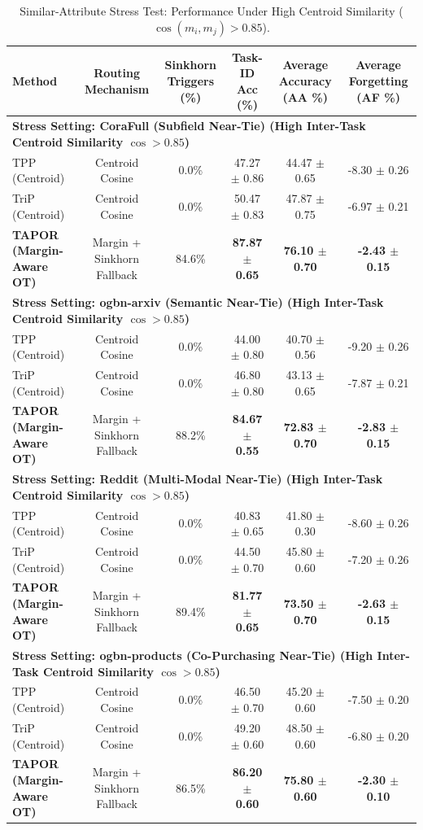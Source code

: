 \begin{table}[t]
\centering
\caption{Similar-Attribute Stress Test: Performance Under High Centroid Similarity ($\cos(m_i, m_j) > 0.85$).}
\begin{tabular}{lccccc}
\hline
\textbf{Method} & \textbf{Routing Mechanism} & \textbf{Sinkhorn Triggers (\%)} & \textbf{Task-ID Acc (\%)} & \textbf{Average Accuracy (AA \%)} & \textbf{Average Forgetting (AF \%)} \\
\hline
\multicolumn{6}{l}{\textbf{Stress Setting: CoraFull (Subfield Near-Tie) (High Inter-Task Centroid Similarity $\cos > 0.85$)}} \\
TPP (Centroid) & Centroid Cosine & 0.0\% & 47.27 $\pm$ 0.86 & 44.47 $\pm$ 0.65 & -8.30 $\pm$ 0.26 \\
TriP (Centroid) & Centroid Cosine & 0.0\% & 50.47 $\pm$ 0.83 & 47.87 $\pm$ 0.75 & -6.97 $\pm$ 0.21 \\
\textbf{TAPOR (Margin-Aware OT)} & Margin + Sinkhorn Fallback & 84.6\% & \textbf{87.87 $\pm$ 0.65} & \textbf{76.10 $\pm$ 0.70} & \textbf{-2.43 $\pm$ 0.15} \\
\hline
\multicolumn{6}{l}{\textbf{Stress Setting: ogbn-arxiv (Semantic Near-Tie) (High Inter-Task Centroid Similarity $\cos > 0.85$)}} \\
TPP (Centroid) & Centroid Cosine & 0.0\% & 44.00 $\pm$ 0.80 & 40.70 $\pm$ 0.56 & -9.20 $\pm$ 0.26 \\
TriP (Centroid) & Centroid Cosine & 0.0\% & 46.80 $\pm$ 0.80 & 43.13 $\pm$ 0.65 & -7.87 $\pm$ 0.21 \\
\textbf{TAPOR (Margin-Aware OT)} & Margin + Sinkhorn Fallback & 88.2\% & \textbf{84.67 $\pm$ 0.55} & \textbf{72.83 $\pm$ 0.70} & \textbf{-2.83 $\pm$ 0.15} \\
\hline
\multicolumn{6}{l}{\textbf{Stress Setting: Reddit (Multi-Modal Near-Tie) (High Inter-Task Centroid Similarity $\cos > 0.85$)}} \\
TPP (Centroid) & Centroid Cosine & 0.0\% & 40.83 $\pm$ 0.65 & 41.80 $\pm$ 0.30 & -8.60 $\pm$ 0.26 \\
TriP (Centroid) & Centroid Cosine & 0.0\% & 44.50 $\pm$ 0.70 & 45.80 $\pm$ 0.60 & -7.20 $\pm$ 0.26 \\
\textbf{TAPOR (Margin-Aware OT)} & Margin + Sinkhorn Fallback & 89.4\% & \textbf{81.77 $\pm$ 0.65} & \textbf{73.50 $\pm$ 0.70} & \textbf{-2.63 $\pm$ 0.15} \\
\hline
\multicolumn{6}{l}{\textbf{Stress Setting: ogbn-products (Co-Purchasing Near-Tie) (High Inter-Task Centroid Similarity $\cos > 0.85$)}} \\
TPP (Centroid) & Centroid Cosine & 0.0\% & 46.50 $\pm$ 0.70 & 45.20 $\pm$ 0.60 & -7.50 $\pm$ 0.20 \\
TriP (Centroid) & Centroid Cosine & 0.0\% & 49.20 $\pm$ 0.60 & 48.50 $\pm$ 0.60 & -6.80 $\pm$ 0.20 \\
\textbf{TAPOR (Margin-Aware OT)} & Margin + Sinkhorn Fallback & 86.5\% & \textbf{86.20 $\pm$ 0.60} & \textbf{75.80 $\pm$ 0.60} & \textbf{-2.30 $\pm$ 0.10} \\
\hline
\end{tabular}
\label{tab:similar_attribute_stress_test}
\end{table}